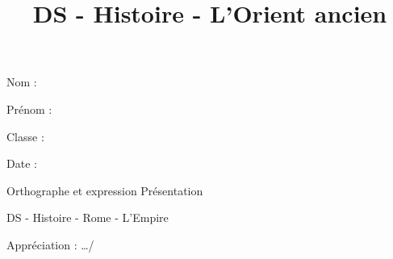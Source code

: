 \documentclass[a4paper,12pt]{exam}
\title{DS - Histoire - L'Orient ancien}
\begin{document}
\begin{minipage}{4cm}
  Nom :
  
  Prénom :
  
  Classe : 
  
  Date : 
\end{minipage}
\hfill
\begin{minipage}{3.5cm}

{\small \begin{questions} \question[1] Orthographe et expression
\question[1] Présentation \end{questions}
}
\end{minipage}


\vspace{1cm}

\begin{center}

{\Large DS - Histoire - Rome - L'Empire}

\vspace{0.5cm}
  \end{center}
Appréciation : \hfill {\large …/\numpoints\ } %

\end{document}
